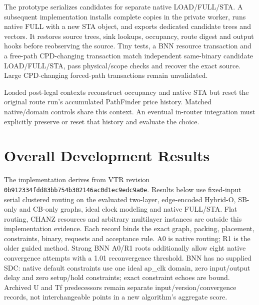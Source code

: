 \documentclass[conference,10pt]{IEEEtran}
\begin{document}
The prototype serializes candidates for separate native LOAD/FULL/STA. A subsequent implementation installs complete copies in the private worker, runs native FULL with a new STA object, and exports dedicated candidate trees and vectors. It restores source trees, sink lookups, occupancy, route digest and output hooks before reobserving the source. Tiny tests, a BNN resource transaction and a free-path CPD-changing transaction match independent same-binary candidate LOAD/FULL/STA, pass physical/scope checks and recover the exact source. Large CPD-changing forced-path transactions remain unvalidated.

Loaded post-legal contexts reconstruct occupancy and native STA but reset the original route run's accumulated PathFinder price history. Matched native/domain controls share this context. An eventual in-router integration must explicitly preserve or reset that history and evaluate the choice.

\section{Overall Development Results}
The implementation derives from VTR revision \texttt{0b912334fdd83bb754b302146ac0d1ec9edc9a0e}. Results below use fixed-input serial clustered routing on the evaluated two-layer, edge-encoded Hybrid-O, SB-only and CB-only graphs, ideal clock modeling and native FULL/STA. Flat routing, CHANZ resources and arbitrary multilayer instances are outside this implementation evidence. Each record binds the exact graph, packing, placement, constraints, binary, requests and acceptance rule. A0 is native routing; R1 is the older guided method. Strong BNN A0/R1 roots additionally allow eight native convergence attempts with a 1.01 reconvergence threshold. BNN has no supplied SDC: native default constraints use one ideal ap\_clk domain, zero input/output delay and zero setup/hold constraints; exact constraint echoes are bound. Archived U and Tf predecessors remain separate input/version/convergence records, not interchangeable points in a new algorithm's aggregate score.
\end{document}

